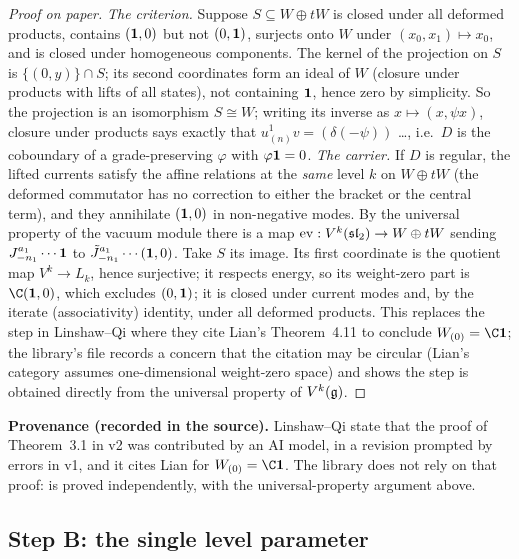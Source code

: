 \begin{proof}[Proof on paper]
\emph{The criterion.} Suppose $S\subseteq W\oplus tW$ is closed under all deformed products, contains
$(\mathbf{1},0)$ but not $(0,\mathbf{1})$, surjects onto $W$ under $(x_0,x_1)\mapsto x_0$, and is closed
under homogeneous components. The kernel of the projection on $S$ is $\{(0,y)\}\cap S$; its second
coordinates form an ideal of $W$ (closure under products with lifts of all states), not containing
$\mathbf{1}$, hence zero by simplicity. So the projection is an isomorphism $S\cong W$; writing its
inverse as $x\mapsto(x,\psi x)$, closure under products says exactly that $u^1_{(n)}v = (\delta(-\psi))$
\ldots, i.e.\ $D$ is the coboundary of a grade-preserving $\varphi$ with $\varphi\mathbf{1} = 0$.
\emph{The carrier.} If $D$ is regular, the lifted currents satisfy the affine relations at the
\emph{same} level $k$ on $W\oplus tW$ (the deformed commutator has no correction to either the bracket
or the central term), and they annihilate $(\mathbf{1},0)$ in non-negative modes. By the universal
property of the vacuum module there is a map $\mathrm{ev}: V^k(\mathfrak{sl}_2)\to W\oplus tW$ sending
$J^{a_1}_{-n_1}\cdots\mathbf{1}$ to $\tilde J^{a_1}_{-n_1}\cdots(\mathbf{1},0)$. Take $S$ its image. Its first
coordinate is the quotient map $V^k\to L_k$, hence surjective; it respects energy, so its weight-zero
part is $\C(\lnineone,0)$, which excludes $(0,\mathbf{1})$; it is closed under current modes and, by the
iterate (associativity) identity, under all deformed products. This replaces the step in Linshaw--Qi
where they cite Lian's Theorem~4.11 to conclude $W_{(0)} = \C\lnineone$; the library's file records a
concern that the citation may be circular (Lian's category assumes one-dimensional weight-zero
space) and shows the step is obtained directly from the universal property of $V^k(\mathfrak{g})$.
\end{proof}

\begin{warning}
\textbf{Provenance (recorded in the source).} Linshaw--Qi state that the proof of Theorem~3.1 in v2 was
contributed by an AI model, in a revision prompted by errors in v1, and it cites Lian for $W_{(0)} =
\C\lnineone$. The library does not rely on that proof:  is proved
independently, with the universal-property argument above.
\end{warning}

\subsection{Step B: the single level parameter}

